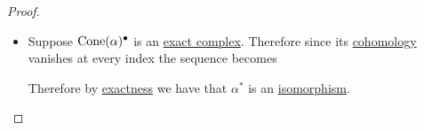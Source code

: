\documentclass[../../../main]{subfiles}
\begin{document}
\begin{proof}
\begin{itemize}
          Using that the last \(\alpha^{\ast}\) is injective and \hyperref[def:exact-sequence]{exactness} we have that
          \begin{align*}
            \ker g = \ker \alpha^{\ast} = \{0\}
          \end{align*}
          i.e: \(g\) is the zero map.

          Therefore we have that \(\cohomology{i}{\mCone{\alpha}{\bullet}} = 0\), meaning that the \hyperref[def:complex]{complex} is \hyperref[def:exact-complex]{exact}.
    \item[\(\impliedby\)] Suppose \(\operatorname{Cone}(\alpha)^{\bullet}\) is an \hyperref[def:exact-complex]{exact complex}.
          Therefore since its \hyperref[def:cohomology]{cohomology} vanishes at every index the sequence becomes
          \begin{center}
          \end{center}
          Therefore by \hyperref[def:exact-sequence]{exactness} we have that \(\alpha^{\ast}\) is an \hyperref[def:categorical-isomorphism]{isomorphism}.
  \end{itemize}
\end{proof}
\end{document}
